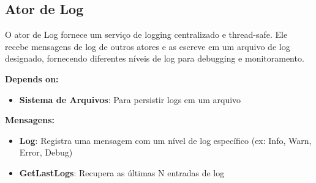\subsection{Ator de Log}

O ator de Log fornece um serviço de logging centralizado e thread-safe. Ele recebe mensagens de log de outros atores e as escreve em um arquivo de log designado, fornecendo diferentes níveis de log para debugging e monitoramento.

\textbf{Depends on:}

\begin{itemize}
    \item \textbf{Sistema de Arquivos}: Para persistir logs em um arquivo
\end{itemize}

\textbf{Mensagens:}

\begin{itemize}
    \item \textbf{Log}: Registra uma mensagem com um nível de log específico (ex: Info, Warn, Error, Debug)
    \item \textbf{GetLastLogs}: Recupera as últimas N entradas de log
\end{itemize}
